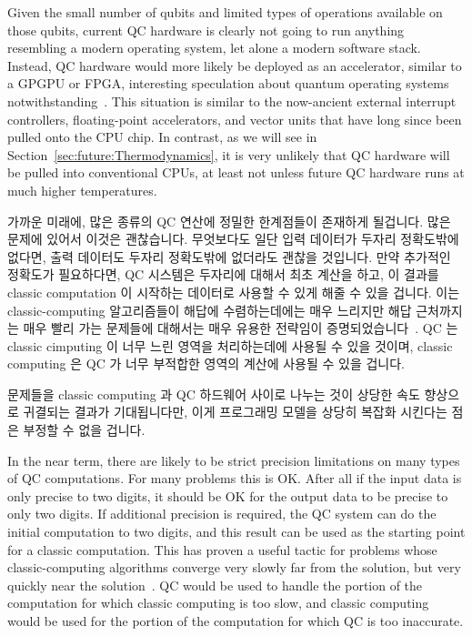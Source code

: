 Given the small number of qubits and limited types of operations available
on those qubits, current QC hardware is clearly not going to run anything
resembling a modern operating system, let alone a modern software stack.
Instead, QC hardware would more likely be deployed as an accelerator,
similar to a GPGPU or FPGA,
interesting speculation about quantum operating systems
notwithstanding~\cite{HenryCorriganGibbs2017QCOS}.
This situation is similar to the now-ancient external interrupt
controllers, floating-point accelerators, and vector units that have
long since been pulled onto the CPU chip.
In contrast, as we will see in Section~\ref{sec:future:Thermodynamics}, 
it is very unlikely that QC hardware will be pulled into conventional
CPUs, at least not unless future QC hardware runs at much higher
temperatures.
\fi

가까운 미래에, 많은 종류의 QC 연산에 정밀한 한계점들이 존재하게 될겁니다.
많은 문제에 있어서 이것은 괜찮습니다.
무엇보다도 일단 입력 데이터가 두자리 정확도밖에 없다면, 출력 데이터도 두자리
정확도밖에 없더라도 괜찮을 것입니다.
만약 추가적인 정확도가 필요하다면, QC 시스템은 두자리에 대해서 최초 계산을
하고, 이 결과를 classic computation 이 시작하는 데이터로 사용할 수 있게 해줄 수
있을 겁니다.
이는 classic-computing 알고리즘들이 해답에 수렴하는데에는 매우 느리지만 해답
근처까지는 매우 빨리 가는 문제들에 대해서는 매우 유용한 전략임이
증명되었습니다~\cite{JakubKurzak2007MixedPrecision}.
QC 는 classic cimputing 이 너무 느린 영역을 처리하는데에 사용될 수 있을 것이며,
classic computing 은 QC 가 너무 부적합한 영역의 계산에 사용될 수 있을 겁니다.

문제들을 classic computing 과 QC 하드웨어 사이로 나누는 것이 상당한 속도
향상으로 귀결되는 결과가 기대됩니다만, 이게 프로그래밍 모델을 상당히 복잡화
시킨다는 점은 부정할 수 없을 겁니다.
\iffalse

In the near term, there are likely to be strict precision limitations
on many types of QC computations.
For many problems this is OK.
After all if the input data is only precise to two digits, it should
be OK for the output data to be precise to only two digits.
If additional precision is required, the QC system can do the
initial computation to two digits, and this result can be used
as the starting point for a classic computation.
This has proven a useful tactic for problems whose classic-computing
algorithms converge very slowly far from the solution, but very
quickly near the solution~\cite{JakubKurzak2007MixedPrecision}.
QC would be used to handle the portion of the computation for which
classic computing is too slow, and classic computing would be used
for the portion of the computation for which QC is too inaccurate.

